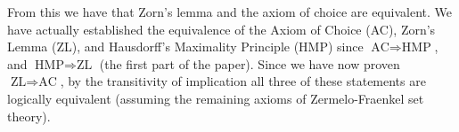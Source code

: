 \documentclass{article}
\theoremstyle{definition}
\begin{document}
            From this we have that Zorn's lemma and the axiom of choice are
            equivalent. We have actually established the equivalence of the
            Axiom of Choice (AC), Zorn's Lemma (ZL), and
            Hausdorff's Maximality Principle (HMP) since
            $\textrm{AC}\Rightarrow\textrm{HMP}$, and
            $\textrm{HMP}\Rightarrow\textrm{ZL}$ (the first part of the paper).
            Since we have now proven $\textrm{ZL}\Rightarrow\textrm{AC}$, by
            the transitivity of implication all three of these statements
            are logically equivalent (assuming the remaining axioms of
            Zermelo-Fraenkel set theory).
\end{document}

